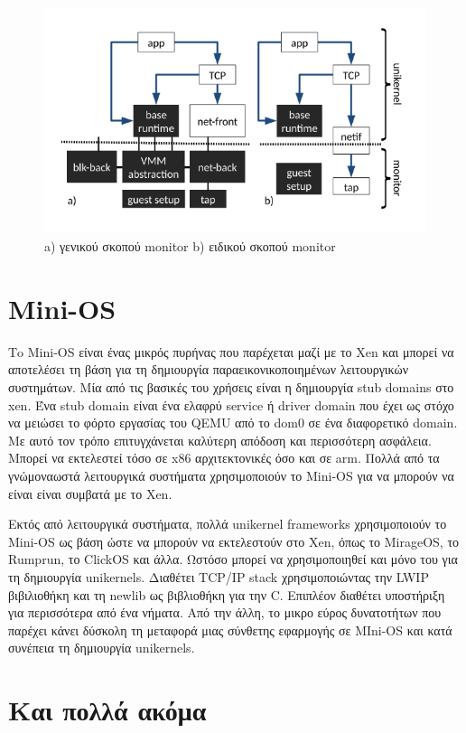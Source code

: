 \begin{figure}[htp]
\centering
\includegraphics[scale=0.6]{figures/solo5.png}
\caption{a) γενικού σκοπού monitor b) ειδικού σκοπού monitor\label{fig3_8}}
\end{figure}

\section{Mini-OS}

Τo Mini-OS είναι ένας μικρός πυρήνας που παρέχεται μαζί με το Xen και μπορεί να
αποτελέσει τη βάση για τη δημιουργία παραεικονικοποιημένων λειτουργικών
συστημάτων. Μία από τις βασικές του χρήσεις είναι η δημιουργία stub domains στο
xen. Ένα stub domain είναι ένα ελαφρύ service ή driver domain που έχει ως στόχο
να μειώσει το φόρτο εργασίας του QEMU από το dom0 σε ένα διαφορετικό domain. Με
αυτό τον τρόπο επιτυγχάνεται καλύτερη απόδοση και περισσότερη ασφάλεια. Μπορεί
να εκτελεστεί τόσο σε x86 αρχιτεκτονικές όσο και σε arm. Πολλά από τα
γνώμοναωστά λειτουργικά συστήματα χρησιμοποιούν το Mini-OS για να μπορούν να
είναι είναι συμβατά με το Xen.

Εκτός από λειτουργικά συστήματα, πολλά unikernel frameworks χρησιμοποιούν το
Mini-OS ως βάση ώστε να μπορούν να εκτελεστούν στο Xen, όπως το MirageOS, το
Rumprun, το ClickOS και άλλα. Ωστόσο  μπορεί να χρησιμοποιηθεί και μόνο του για
τη δημιουργία unikernels. Διαθέτει TCP/IP stack χρησιμοποιώντας την LWIP
βιβιλιοθήκη και τη newlib ως βιβλιοθήκη για την C. Επιπλέον διαθέτει υποστήριξη
για περισσότερα από ένα νήματα. Από την άλλη, το μικρο εύρος δυνατοτήτων που
παρέχει κάνει δύσκολη τη μεταφορά μιας σύνθετης εφαρμογής σε MIni-OS και κατά
συνέπεια τη δημιουργία unikernels.

\section{Και πολλά ακόμα}

